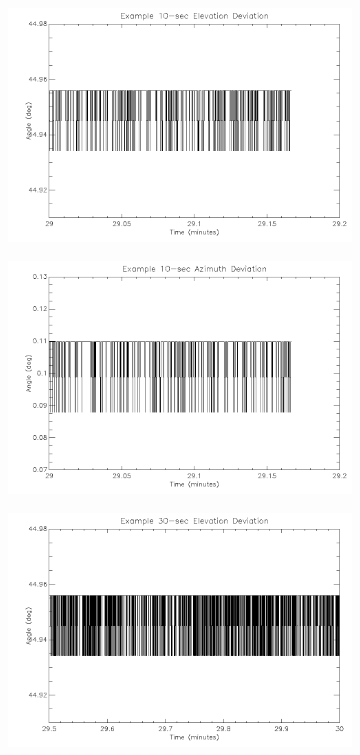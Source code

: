 {\begin{figure}[htbp]
\begin{subfigure}{0.45\textwidth}
		\includegraphics[width=1\linewidth]{appendix/img/campaign_results/earlyalt10.png}
		\caption{}
		\label{fig:sub:earlyalt10}
	\end{subfigure}
	\begin{subfigure}{0.45\textwidth}
		\includegraphics[width=1\linewidth]{appendix/img/campaign_results/earlyaz10sec.png}
		\caption{}
		\label{fig:sub:earlyaz10}
	\end{subfigure}
	\begin{subfigure}{0.45\textwidth}
		\includegraphics[width=1\linewidth]{appendix/img/campaign_results/earlyalt30.png}

\end{subfigure}
\end{figure}}
